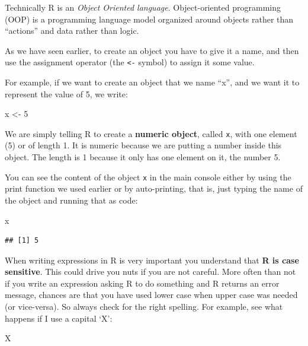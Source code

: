 \documentclass[
]{book}
\newenvironment{Shaded}{\begin{snugshade}}{\end{snugshade}}
\newcommand{\DecValTok}[1]{\textcolor[rgb]{0.00,0.00,0.81}{#1}}
\newcommand{\NormalTok}[1]{#1}
\newcommand{\OtherTok}[1]{\textcolor[rgb]{0.56,0.35,0.01}{#1}}
\begin{document}
Technically R is an \emph{Object Oriented language}. Object-oriented programming (OOP) is a programming language model organized around objects rather than ``actions'' and data rather than logic.

As we have seen earlier, to create an object you have to give it a name, and then use the assignment operator (the \texttt{\textless{}-} symbol) to assign it some value.

For example, if we want to create an object that we name ``x'', and we want it to represent the value of 5, we write:

\begin{Shaded}
\begin{Highlighting}[]
\NormalTok{x }\OtherTok{\textless{}{-}} \DecValTok{5}
\end{Highlighting}
\end{Shaded}

We are simply telling R to create a \textbf{numeric object}, called \texttt{x}, with one element (5) or of length 1. It is numeric because we are putting a number inside this object. The length is 1 because it only has one element on it, the number 5.

You can see the content of the object \texttt{x} in the main console either by using the print function we used earlier or by auto-printing, that is, just typing the name of the object and running that as code:

\begin{Shaded}
\begin{Highlighting}[]
\NormalTok{x}
\end{Highlighting}
\end{Shaded}

\begin{verbatim}
## [1] 5
\end{verbatim}

When writing expressions in R is very important you understand that \textbf{R is case sensitive}. This could drive you nuts if you are not careful. More often than not if you write an expression asking R to do something and R returns an error message, chances are that you have used lower case when upper case was needed (or vice-versa). So always check for the right spelling. For example, see what happens if I use a capital `X':

\begin{Shaded}
\begin{Highlighting}[]
\NormalTok{X}
\end{Highlighting}
\end{Shaded}
\end{document}
